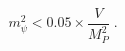 \begin{equation}
\label{eq:slow-roll_mass}
m_{\psi}^2 < 0.05 \times \frac{V}{M_P^2} \;.
\end{equation}

